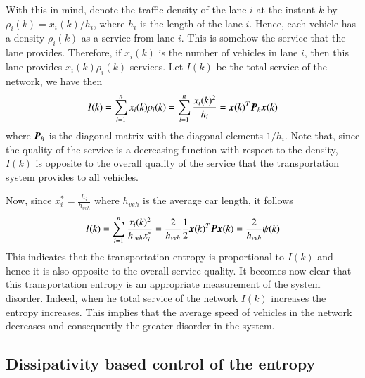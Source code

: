 \documentclass[preprint,authoryear,12pt]{elsarticle}
\renewcommand{\vec}[1]{\mbox{\boldmath$#1$}}
\newcommand{\mat}[1]{\mbox{\boldmath$#1$}}
\begin{document}
With this in mind, denote the traffic density of the lane $i$ at the
instant $k$ by $\rho_i(k)=x_i(k)/h_i$, where $h_i$ is the length of
the lane $i$. Hence, each vehicle has a density $\rho_i(k)$ as a
service from lane $i$. This is somehow the service that the lane 
provides. Therefore, if $x_i(k)$ is the number of vehicles in lane
$i$, then this lane provides $x_i(k)\rho_i(k)$ services.
Let $I(k)$ be the total service of the network, we have then
\begin{equation}
\label{equ:quality_service}
I(k)=\sum_{i=1}^{n} x_i(k)\rho_i(k)
=\sum_{i=1}^{n}\frac{x_i(k)^2}{h_i}
=\vec{x}(k)^T\mat{P}_h\vec{x}(k)
\end{equation}
where $\mat{P}_h$ is the diagonal matrix with the diagonal elements
$1/h_i$. Note that, since the quality of the service is a decreasing 
function with respect to the density, $I(k)$ is opposite to the
overall quality of the service that the transportation system provides
to all vehicles.

Now, since $x_i^*=\frac{h_i}{h_{veh}}$ where $h_{veh}$ is the average
car length, it follows
\begin{equation}
I(k) = \sum_{i=1}^{n}\frac{x_i(k)^2}{h_{veh} x_i^*}
= \frac{2}{h_{veh}} \frac{1}{2}\vec{x}(k)^T\mat{P}\vec{x}(k)
= \frac{2}{h_{veh}} \psi(k)
\end{equation}
This indicates that the transportation entropy is proportional to
$I(k)$ and hence it is also opposite to the overall service quality. It
becomes now clear that this transportation entropy is an appropriate
measurement of the system disorder. Indeed, when he total service of the network  $I(k)$ increases the entropy   increases. This
implies that the average speed of vehicles in the network decreases and consequently the
greater disorder in the system.







\subsection{Dissipativity based control of the entropy}
\end{document}
